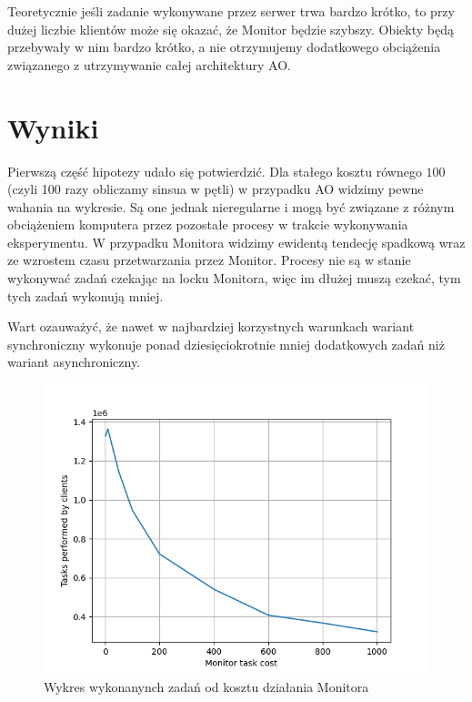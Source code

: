 \documentclass[12pt,a4paper,table]{article}
\begin{document}
    Teoretycznie jeśli zadanie wykonywane przez serwer trwa bardzo krótko, to przy dużej liczbie 
    klientów może się okazać, że Monitor będzie szybszy. Obiekty będą przebywały w nim bardzo krótko,
    a nie otrzymujemy dodatkowego obciążenia związanego z utrzymywanie całej architektury AO.


    \section{Wyniki} 
    Pierwszą część hipotezy udało się potwierdzić. Dla stałego kosztu równego $100$ 
    (czyli 100 razy obliczamy sinsua w pętli) w przypadku AO widzimy pewne wahania na wykresie. Są one 
    jednak nieregularne i mogą być związane z różnym obciążeniem komputera przez pozostałe procesy w 
    trakcie wykonywania eksperymentu. W przypadku Monitora widzimy ewidentą tendecję spadkową
    wraz ze wzrostem czasu przetwarzania przez Monitor. Procesy nie są w stanie wykonywać zadań
    czekając na locku Monitora, więc im dłużej muszą czekać, tym tych zadań wykonują mniej. 

    Wart ozauważyć, że nawet w najbardziej korzystnych warunkach wariant synchroniczny wykonuje ponad
    dziesięciokrotnie mniej dodatkowych zadań niż wariant asynchroniczny.

    \begin{figure}[H]
        \centering
        \includegraphics[width=0.8\linewidth]{img/synchro_100client.png}
        \caption{Wykres wykonanynch zadań od kosztu działania Monitora}
        \label{fig:synchro_100client}
    \end{figure}
\end{document}
